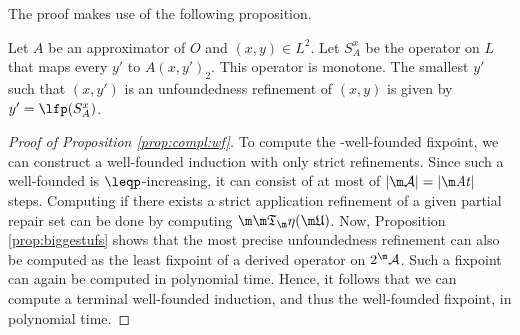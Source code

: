 The proof makes use of the following proposition. 
\begin{proposition}\label{prop:biggestufs}
Let $A$ be an approximator of $O$ and $(x,y)\in L^2$. 
Let $S_A^x$ be the operator on $L$ that maps every $y'$ to $A(x,y')_2$.
This operator is monotone. 
The smallest $y'$ such that $(x,y')$ is an unfoundedness refinement of $(x,y)$ is given by 
$y'=\lfp (S_A^x)$.
 \end{proposition}
 \begin{proof}[Proof of Proposition \ref{prop:compl:wf}]
 To compute the \Ap-well-founded fixpoint, we can construct a well-founded induction with only strict refinements. 
 Since such a well-founded is $\leqp$-increasing, it can consist of at most of $|\acts|=|\atoms|$ steps. 
 Computing if there exists a strict application refinement of a given partial repair set \UUU
can be done by computing $\Ap(\UUU)$. Now, Proposition \ref{prop:biggestufs} shows that the most precise unfoundedness refinement can also be computed as the least fixpoint of a derived operator on $2^\acts$. Such a fixpoint can again be computed in polynomial time. Hence, it follows that we can compute a terminal well-founded induction, and thus the well-founded fixpoint, in polynomial time. 
%  
\end{proof}


